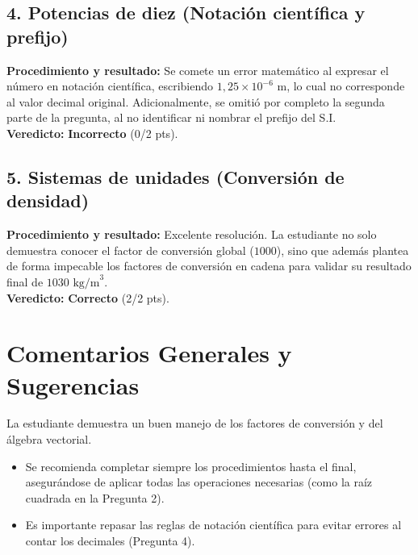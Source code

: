 \documentclass[12pt]{article}
\begin{document}
\subsection*{4. Potencias de diez (Notación científica y prefijo)}
\textbf{Procedimiento y resultado:} Se comete un error matemático al expresar el número en notación científica, escribiendo $1,25 \times 10^{-6}$ m, lo cual no corresponde al valor decimal original. Adicionalmente, se omitió por completo la segunda parte de la pregunta, al no identificar ni nombrar el prefijo del S.I. \\
\textbf{Veredicto:} \textbf{Incorrecto} (0/2 pts).

\subsection*{5. Sistemas de unidades (Conversión de densidad)}
\textbf{Procedimiento y resultado:} Excelente resolución. La estudiante no solo demuestra conocer el factor de conversión global ($1000$), sino que además plantea de forma impecable los factores de conversión en cadena para validar su resultado final de $1030 \text{ kg/m}^3$. \\
\textbf{Veredicto:} \textbf{Correcto} (2/2 pts).

\vspace{0.5cm}
\section*{Comentarios Generales y Sugerencias}
La estudiante demuestra un buen manejo de los factores de conversión y del álgebra vectorial.
\begin{itemize}
    \item Se recomienda completar siempre los procedimientos hasta el final, asegurándose de aplicar todas las operaciones necesarias (como la raíz cuadrada en la Pregunta 2).
    \item Es importante repasar las reglas de notación científica para evitar errores al contar los decimales (Pregunta 4).
\end{itemize}
\end{document}
